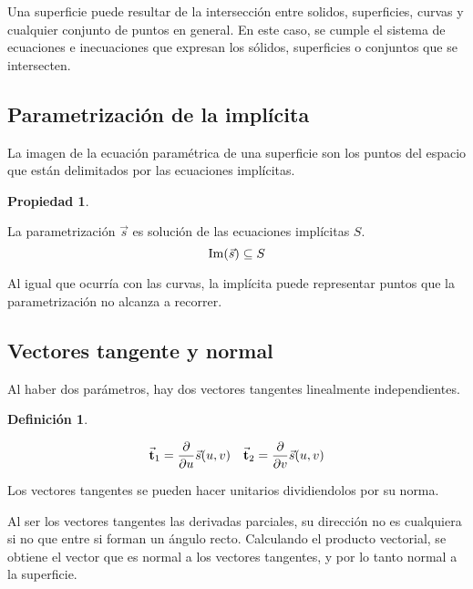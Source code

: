 \documentclass[a5paper,12pt,twoside]{book}
\newtheorem{defn}{{Definición}}[chapter]
\newtheorem{prop}{{Propiedad}}[chapter]
\begin{document}

Una superficie puede resultar de la intersección entre solidos, superficies, curvas y cualquier conjunto de puntos en general.
En este caso, se cumple el sistema de ecuaciones e inecuaciones que expresan los sólidos, superficies o conjuntos que se intersecten.


\subsection{Parametrización de la implícita}

La imagen de la ecuación paramétrica de una superficie son los puntos del espacio que están delimitados por las ecuaciones implícitas.

\begin{mdframed}[style=PropertyFrame]
    \begin{prop}
    \end{prop}
    La parametrización $\Vec{s}$ es solución de las ecuaciones implícitas $S$.
    \begin{equation*}
        \operatorname{Im} (\Vec{s}) \subseteq S
    \end{equation*}
\end{mdframed}

Al igual que ocurría con las curvas, la implícita puede representar puntos que la parametrización no alcanza a recorrer.


\subsection{Vectores tangente y normal}

Al haber dos parámetros, hay dos vectores tangentes linealmente independientes.

\begin{mdframed}[style=DefinitionFrame]
    \begin{defn}
    \end{defn}
    \begin{equation*}
        \Vec{\textbf{t}}_1 = \frac{\partial}{\partial u} \Vec{s}(u,v)
        \quad
        \Vec{\textbf{t}}_2 = \frac{\partial}{\partial v} \Vec{s}(u,v)
    \end{equation*}
\end{mdframed}

Los vectores tangentes se pueden hacer unitarios dividiendolos por su norma.

Al ser los vectores tangentes las derivadas parciales, su dirección no es cualquiera si no que entre si forman un ángulo recto.
Calculando el producto vectorial, se obtiene el vector que es normal a los vectores tangentes, y por lo tanto normal a la superficie.
\end{document}
